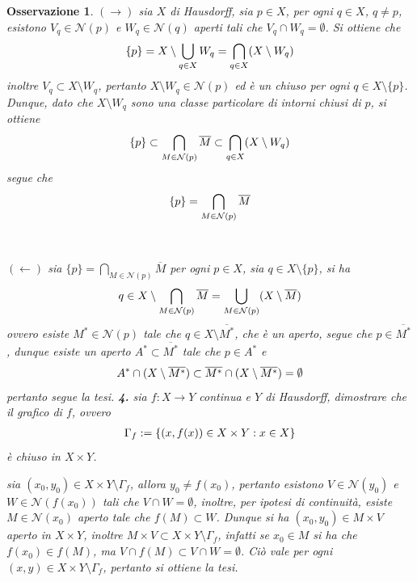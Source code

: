 \documentclass[oneside, 11pt]{amsbook}
\makeatletter
\newcommand{\0}{{(0)}}
\newcommand{\3}{{(3)}}
\theoremstyle{colonplain}
\theoremstyle{colondefinition}
\theoremstyle{colonremark}
\newtheorem{rmk}[thm]{Osservazione}
\numberwithin{equation}{chapter}
\renewcommand{\proofname}{Dimostrazione}
\renewenvironment{proof}[1][\proofname]{\par
  \pushQED{\end{proof}}%
  \normalfont \topsep6\p@\@plus6\p@\relax
  \trivlist
  \item[\hskip\labelsep\bfseries #1:]\ignorespaces
}{%
  \popQED\endtrivlist\@endpefalse
}
\makeatother
\begin{document}
\begin{rmk}
\begin{proof}
$(\rightarrow)$ sia $X$ di Hausdorff, sia $p \in X$, per ogni $q \in X$, $q \neq p$, esistono $V_q \in \mathcal{N}(p)$ e $W_q \in \mathcal{N}(q)$ aperti tali che $V_q \cap W_q = \emptyset$. Si ottiene che
\begin{align}
    \{ p \} = X \setminus \bigcup_{q \in X} W_q = \bigcap_{q \in X} (X \setminus W_q) \notag
\end{align}
inoltre $V_q \subset X \setminus W_q$, pertanto $X \setminus W_q \in \mathcal{N}(p)$ ed è un chiuso per ogni $q \in X \setminus \{ p \}$. Dunque, dato che $X \setminus W_q$ sono una classe particolare di intorni chiusi di $p$, si ottiene
\begin{align}
    \{ p \} \subset \bigcap_{M \in \mathcal{N}(p)} \overline{M} \subset \bigcap_{q \in X} (X \setminus W_q) \notag
\end{align}
segue che
\begin{align}
    \{ p \} = \bigcap_{M \in \mathcal{N}(p)} \overline{M} \notag
\end{align} \\ \\
$(\leftarrow)$ sia $\{ p \} = \bigcap_{M \in \mathcal{N}(p)} \overline{M}$ per ogni $p \in X$, sia $q \in X \setminus \{ p \}$, si ha
\begin{align}
    q \in X \setminus \bigcap_{M \in \mathcal{N}(p)} \overline{M} = \bigcup_{M \in \mathcal{N}(p)} (X \setminus \overline{M}) \notag
\end{align}
ovvero esiste $M^* \in \mathcal{N}(p)$ tale che $q \in X \setminus \overline{M^*}$, che è un aperto, segue che $p \in \overline{M^*}$, dunque esiste un aperto $A^* \subset \overline{M^*}$ tale che $p \in A^*$ e
\begin{align}
    A^* \cap (X \setminus \overline{M^*}) \subset \overline{M^*} \cap (X \setminus \overline{M^*}) = \emptyset \notag
\end{align}
pertanto segue la tesi.
\end{proof}
\textbf{4.} sia $f : X \longrightarrow Y$ continua e $Y$ di Hausdorff, dimostrare che il grafico di $f$, ovvero
\begin{align}
    \Gamma_f := \{ (x, f(x)) \in X \times Y : x \in X \} \notag
\end{align}
è chiuso in $X \times Y$.
\begin{proof}
sia $(x_0, y_0) \in X \times Y \setminus \Gamma_f$, allora $y_0 \neq f(x_0)$, pertanto esistono $V \in \mathcal{N}(y_0)$ e $W \in \mathcal{N}(f(x_0))$ tali che $V \cap W = \emptyset$, inoltre, per ipotesi di continuità, esiste $M \in \mathcal{N}(x_0)$ aperto tale che $f(M) \subset W$. Dunque si ha $(x_0, y_0) \in M \times V$ aperto in $X \times Y$, inoltre $M \times V \subset X \times Y \setminus \Gamma_f$, infatti se $x_0 \in M$ si ha che $f(x_0) \in f(M)$, ma $V \cap f(M) \subset V \cap W = \emptyset$. Ciò vale per ogni $(x, y) \in X \times Y \setminus \Gamma_f$, pertanto si ottiene la tesi.
\end{proof}


\end{rmk}
\end{document}
